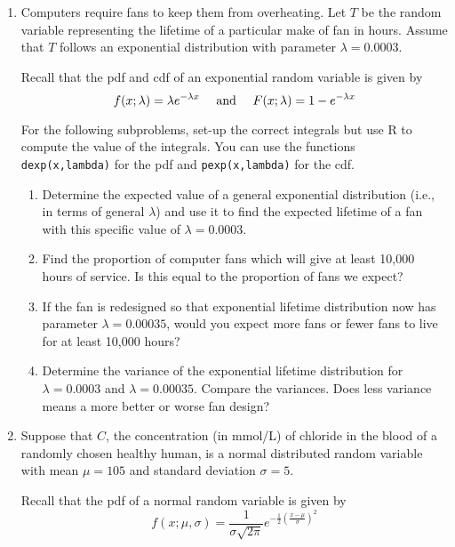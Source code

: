 \documentclass[
]{article}
\providecommand{\tightlist}{%
  \setlength{\itemsep}{0pt}\setlength{\parskip}{0pt}}
\begin{document}
\begin{enumerate}
\def\labelenumi{\arabic{enumi}.}
\item
  Computers require fans to keep them from overheating. Let \(T\) be the random variable representing the lifetime of a particular make of fan in hours. Assume that \(T\) follows an exponential distribution with parameter \(\lambda = 0.0003\).

  Recall that the pdf and cdf of an exponential random variable is given by
  \[f(x;\lambda) = \lambda e^{-\lambda x} \hspace{10px} \text{ and } \hspace{10px} F(x;\lambda) = 1- e^{-\lambda x}\]

  For the following subproblems, set-up the correct integrals but use R to compute the value of the integrals. You can use the functions \texttt{dexp(x,lambda)} for the pdf and \texttt{pexp(x,lambda)} for the cdf.

  \begin{enumerate}
  \def\labelenumii{\alph{enumii}.}
  \tightlist
  \item
    Determine the expected value of a general exponential distribution (i.e., in terms of general \(\lambda\)) and use it to find the expected lifetime of a fan with this specific value of \(\lambda = 0.0003\).
  \item
    Find the proportion of computer fans which will give at least 10,000 hours of service. Is this equal to the proportion of fans we expect?
  \item
    If the fan is redesigned so that exponential lifetime distribution now has parameter \(\lambda = 0.00035\), would you expect more fans or fewer fans to live for at least 10,000 hours?
  \item
    Determine the variance of the exponential lifetime distribution for \(\lambda = 0.0003\) and \(\lambda = 0.00035\). Compare the variances. Does less variance means a more better or worse fan design?
  \end{enumerate}
\item
  Suppose that \(C\), the concentration (in mmol/L) of chloride in the blood of a randomly chosen healthy human, is a normal distributed random variable with mean \(\mu = 105\) and standard deviation \(\sigma = 5\).

  Recall that the pdf of a normal random variable is given by
  \[f(x;\mu,\sigma) = \frac{1}{\sigma\sqrt{2\pi}} e^{-\frac{1}{2}\left( \frac{x-\mu}{\sigma} \right)^2}\]


\end{enumerate}
\end{document}
